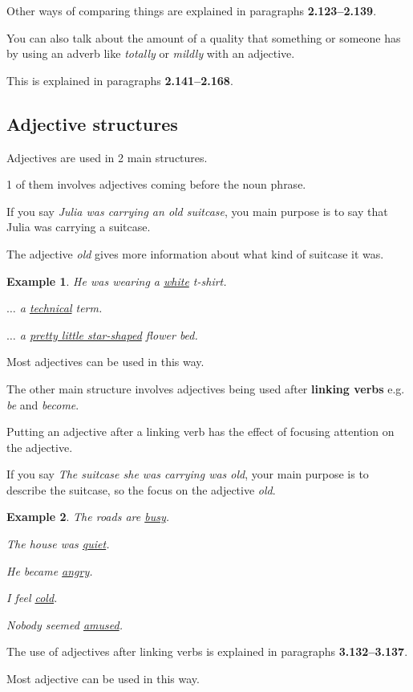 \documentclass[oneside]{book}
\numberwithin{equation}{section}
\newtheorem{example}{Example}[section]
\begin{document}
Other ways of comparing things are explained in paragraphs \textbf{2.123--2.139}.

%
\noindent{} You can also talk about the amount of a quality that something or someone has by using an adverb like \textit{totally} or \textit{mildly} with an adjective.

%
This is explained in paragraphs \textbf{2.141--2.168}.

\subsection{Adjective structures}
\noindent{} Adjectives are used in 2 main structures.

1 of them involves adjectives coming before the noun phrase.

If you say \textit{Julia was carrying an old suitcase}, you main purpose is to say that Julia was carrying a suitcase.

The adjective \textit{old} gives more information about what kind of suitcase it was.
\begin{example}
    He was wearing a \underline{white} t-shirt.
    
    $\ldots$ a \underline{technical} term.
    
    $\ldots$ a \underline{pretty little star-shaped} flower bed.
\end{example}
Most adjectives can be used in this way.

%
\noindent{} The other main structure involves adjectives being used after \textbf{linking verbs} e.g. \textit{be} and \textit{become}.

Putting an adjective after a linking verb has the effect of focusing attention on the adjective.

If you say \textit{The suitcase she was carrying was old}, your main purpose is to describe the suitcase, so the focus on the adjective \textit{old}.
\begin{example}
    The roads are \underline{busy}.
    
    The house was \underline{quiet}.
    
    He became \underline{angry}.
    
    I feel \underline{cold}.
    
    Nobody seemed \underline{amused}.
\end{example}
The use of adjectives after linking verbs is explained in paragraphs \textbf{3.132--3.137}.

%
Most adjective can be used in this way.
\end{document}
